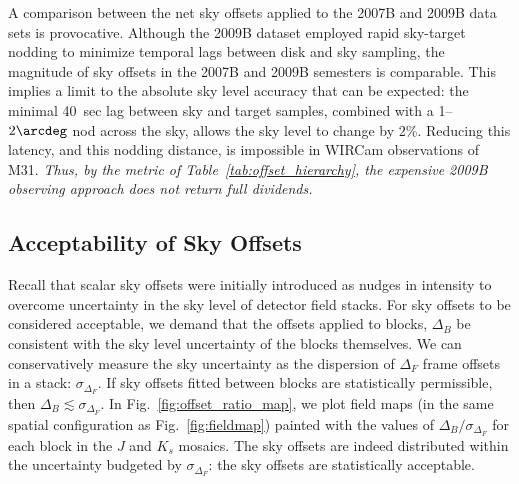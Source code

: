 \documentclass[iop]{emulateapj}
\newcommand{\Fig}[1]{Fig.~\ref{fig:#1}}  %
\newcommand{\Tab}[1]{Table~\ref{tab:#1}}  %
\begin{document}
A comparison between the net sky offsets applied to the 2007B and 2009B data sets is provocative.
Although the 2009B dataset employed rapid sky-target nodding to minimize temporal lags between disk and sky sampling, the magnitude of sky offsets in the 2007B and 2009B semesters is comparable.
This implies a limit to the absolute sky level accuracy that can be expected: the minimal 40~sec lag between sky and target samples, combined with a 1--$2\arcdeg$ nod across the sky, allows the sky level to change by 2\%.
Reducing this latency, and this nodding distance, is impossible in WIRCam observations of M31.
\emph{Thus, by the metric of \Tab{offset_hierarchy}, the expensive 2009B observing approach does not return full dividends.}


\begin{table}[t]
\centering
\caption[Hierarchy of scalar sky offsets]{Hierarchy of scalar sky offsets (using \texttt{FW100K} RT flat fielding, and median sky subtraction).
The `Total' sky offsets track the net offset of individual WIRCam image frames into the fitted mosaic.
$\langle I_\mathrm{sky}\rangle$ is taken as the instantaneous sky level for the images being sampled (see \Fig{net_sky_level} for the distribution of levels).
Offset distributions are also presented in units of the WIRCam mosaics, DN, corresponding to a zeropoint of 25 mag.}
\label{tab:offset_hierarchy}

\end{table}

\subsection{Acceptability of Sky Offsets}
\label{sec:offset_acceptability}

Recall that scalar sky offsets were initially introduced as nudges in intensity to overcome uncertainty in the sky level of detector field stacks.
For sky offsets to be considered acceptable, we demand that the offsets applied to blocks, $\Delta_B$ be consistent with the sky level uncertainty of the blocks themselves.
We can conservatively measure the sky uncertainty as the dispersion of $\Delta_F$ frame offsets in a stack: $\sigma_{\Delta_F}$.
If sky offsets fitted between blocks are statistically permissible, then $\Delta_B \lesssim \sigma_{\Delta_F}$.
In \Fig{offset_ratio_map}, we plot field maps (in the same spatial configuration as \Fig{fieldmap}) painted with the values of $\Delta_B / \sigma_{\Delta_F}$ for each block in the $J$ and $K_s$ mosaics.
The sky offsets are indeed distributed within the uncertainty budgeted by $\sigma_{\Delta_F}$: the sky offsets are statistically acceptable.
\end{document}
